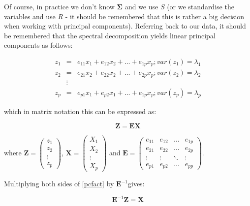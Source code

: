 Of course, in practice we don't know $\boldsymbol{\Sigma}$ and we use  $S$ (or we standardise the variables and use $R$ - it should be remembered that this is rather a big decision when working with principal components).   Referring back to our data, it should be remembered that the spectral decomposition yields linear principal components as follows:

\begin{eqnarray*}
z_{1} &=& e_{11}x_{1} + e_{12}x_{2} + \ldots + e_{1p} x_{p}; var(z_{1})=\lambda_{1}\\
z_{2} &=& e_{21}x_{2} + e_{22}x_{2} + \ldots + e_{2p} x_{p}; var(z_{2})=\lambda_{2}\\
&\vdots&\\
z_{p} &=& e_{p1}x_{1} + e_{p2}x_{1} + \ldots + e_{1p} x_{p}; var(z_{p})=\lambda_{p}
\end{eqnarray*}

which in matrix notation this can be expressed as: 

\begin{equation}
\label{pcfact}
\boldsymbol{Z} = \boldsymbol{E}\boldsymbol{X}
\end{equation}

where  $\boldsymbol{Z} = \left( \begin{array}{c} z_{1} \\ z_{2} \\ \vdots \\ z_{p} \end{array} \right)$,  $\boldsymbol{X} = \left( \begin{array}{c} X_{1} \\ X_{2} \\ \vdots \\ X_{p} \end{array} \right)$ and  $\boldsymbol{E} = \left( \begin{array}{cccc} e_{11} & e_{12} & \hdots & e_{1p} \\ 
e_{21}& e_{22} & \hdots & e_{2p} \\
 \vdots & \vdots & \ddots & \vdots \\ 
e_{p1} & e_{p2} & \hdots & e_{pp}  \end{array} \right)$.   

Multiplying both sides of \ref{pcfact} by $\boldsymbol{E}^{-1}$gives:

\begin{equation}
\boldsymbol{E}^{-1} \boldsymbol{Z} = \boldsymbol{X}
\end{equation}

